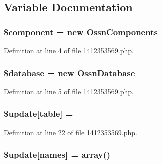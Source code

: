 \subsection{Variable Documentation}
\subsubsection[{\texorpdfstring{\$component}{$component}}]{\setlength{\rightskip}{0pt plus 5cm}\$component = new {\bf Ossn\+Components}}\hypertarget{1412353569_8php_a211527c21ba56109545060b49b628e59}{}\label{1412353569_8php_a211527c21ba56109545060b49b628e59}


Definition at line 4 of file 1412353569.\+php.

\subsubsection[{\texorpdfstring{\$database}{$database}}]{\setlength{\rightskip}{0pt plus 5cm}\${\bf database} = new {\bf Ossn\+Database}}\hypertarget{1412353569_8php_a7691c0162d89de0b6ba47edcd8ba8878}{}\label{1412353569_8php_a7691c0162d89de0b6ba47edcd8ba8878}


Definition at line 5 of file 1412353569.\+php.

\subsubsection[{\texorpdfstring{\$update}{$update}}]{\setlength{\rightskip}{0pt plus 5cm}\${\bf update}\mbox{[}\textquotesingle{}table\textquotesingle{}\mbox{]} = \textquotesingle{}}\hypertarget{1412353569_8php_aee7ba5985ddf023a93862ab77e9718f9}{}\label{1412353569_8php_aee7ba5985ddf023a93862ab77e9718f9}


Definition at line 22 of file 1412353569.\+php.

\subsubsection[{\texorpdfstring{\$update}{$update}}]{\setlength{\rightskip}{0pt plus 5cm}\${\bf update}\mbox{[}\textquotesingle{}names\textquotesingle{}\mbox{]} = array(\textquotesingle{})}\hypertarget{1412353569_8php_abcf5ad2e4fef35de04bef0168cc91ddc}{}\label{1412353569_8php_abcf5ad2e4fef35de04bef0168cc91ddc}


